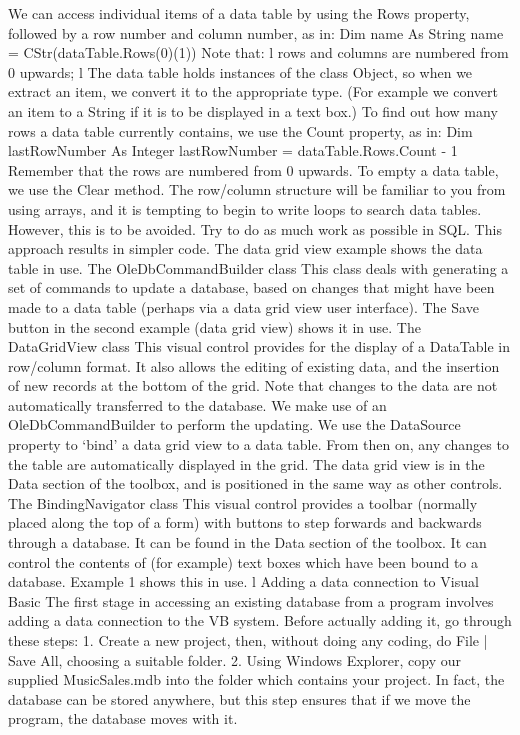 We can access individual items of a data table by using the Rows property, followed by a row number and column number, as in:
Dim name As String
name = CStr(dataTable.Rows(0)(1))
Note that:
l	rows and columns are numbered from 0 upwards;
l	The data table holds instances of the class Object, so when we extract an item, we convert it to the appropriate type. (For example we convert an item to a String if it is to be displayed in a text box.)
To ﬁnd out how many rows a data table currently contains, we use the Count property, as in:
Dim lastRowNumber As Integer
lastRowNumber = dataTable.Rows.Count - 1
Remember that the rows are numbered from 0 upwards. To empty a data table, we use the Clear method.
The row/column structure will be familiar to you from using arrays, and it is tempting to begin to write loops to search data tables. However, this is to be avoided. Try to do as much work as possible in SQL. This approach results in simpler code. The data grid view example shows the data table in use.
The OleDbCommandBuilder class
This class deals with generating a set of commands to update a database, based on changes that might have been made to a data table (perhaps via a data grid view user interface). The Save button in the second example (data grid view) shows it in use.
The DataGridView class
This visual control provides for the display of a DataTable in row/column format. It also allows the editing of existing data, and the insertion of new records at the bottom of the grid. Note that changes to the data are not automatically transferred to the database. We make use of an OleDbCommandBuilder to perform the updating.
We use the DataSource property to ‘bind’ a data grid view to a data table. From then on, any changes to the table are automatically displayed in the grid. The data grid view is in the Data section of the toolbox, and is positioned in the same way as other controls.
The BindingNavigator class
This visual control provides a toolbar (normally placed along the top of a form) with buttons to step forwards and backwards through a database. It can be found in the Data section of the toolbox. It can control the contents of (for example) text boxes which have been bound to a database. Example 1 shows this in use.
l	Adding a data connection to Visual Basic
The ﬁrst stage in accessing an existing database from a program involves adding a data connection to the VB system. Before actually adding it, go through these steps:
1.	Create a new project, then, without doing any coding, do File | Save All, choosing a suitable folder.
2.	Using Windows Explorer, copy our supplied MusicSales.mdb into the folder which contains your project. In fact, the database can be stored anywhere, but this step ensures that if we move the program, the database moves with it.
